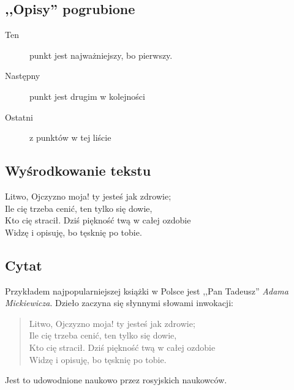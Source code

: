 \documentclass [a4paper, fleqn, 12pt] {mwrep}
\begin{document}
	\subsection {,,Opisy'' pogrubione}
		\begin {description}
		\item [Ten] {punkt jest najważniejszy, bo pierwszy.}
		\item [Następny] {punkt jest drugim w kolejności}
		\item [Ostatni] {z punktów w tej liście}
		\end {description}
	
	\subsection {Wyśrodkowanie tekstu}
		\begin {center}
		Litwo, Ojczyzno moja! ty jesteś jak zdrowie; \\
		Ile cię trzeba cenić, ten tylko się dowie, \\
		Kto cię stracił. Dziś piękność twą w całej ozdobie \\
		Widzę i opisuję, bo tęsknię po tobie. \\
		\end {center}

	\subsection {Cytat}
		Przykładem najpopularniejszej książki w Polsce jest
		,,Pan Tadeusz'' \textit{Adama Mickiewicza}.
		Dzieło zaczyna się słynnymi słowami inwokacji:
		\begin {quote}
		Litwo, Ojczyzno moja! ty jesteś jak zdrowie; \\
		Ile cię trzeba cenić, ten tylko się dowie, \\
		Kto cię stracił. Dziś piękność twą w całej ozdobie \\
		Widzę i opisuję, bo tęsknię po tobie. \\
		\end {quote}
		Jest to udowodnione naukowo przez rosyjskich naukowców.
\end{document}
